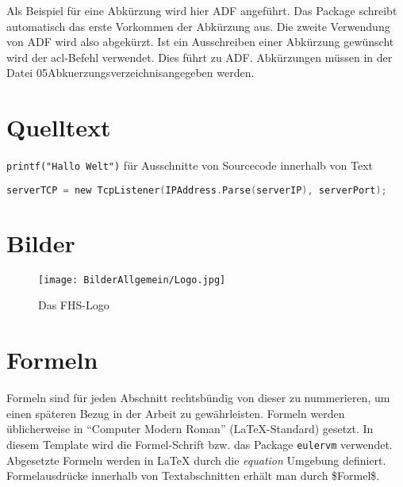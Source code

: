 Als Beispiel für eine Abkürzung wird hier \ac{ADF} angeführt. Das Package schreibt automatisch das erste Vorkommen der Abkürzung aus. Die zweite Verwendung von \ac{ADF} wird also abgekürzt. Ist ein Ausschreiben einer Abkürzung gewünscht wird der acl-Befehl verwendet. Dies führt zu \acl{ADF}. Abkürzungen müssen in der Datei \glqq 05Abkuerzungsverzeichnis\grqq angegeben werden.

\section{Quelltext}

\texttt{printf("Hallo Welt")} für Ausschnitte von Sourcecode innerhalb von Text

\begin{lstlisting}[language=C,
caption=Beispiel-Listing,
label=LST_SAMPLE]
serverTCP = new TcpListener(IPAddress.Parse(serverIP), serverPort);
\end{lstlisting}



\section{Bilder}

\begin{figure}[H]
\begin{center}
	\texttt{[image: BilderAllgemein/Logo.jpg]}
\end{center}
	\caption{Das FHS-Logo}
	\label{FIG_LOGO}
\end{figure}

\section{Formeln}

Formeln sind für jeden Abschnitt rechtsbündig von dieser zu nummerieren, um einen späteren Bezug in der Arbeit zu gewährleisten. Formeln werden üblicherweise in "`Computer Modern Roman"' (\LaTeX{}-Standard) gesetzt. In diesem Template wird die Formel-Schrift bzw. das Package \texttt{eulervm} verwendet. Abgesetzte Formeln werden in \LaTeX{} durch die 
\emph{equation} Umgebung definiert. Formelausdrücke innerhalb von Textabschnitten erhält man durch \$Formel\$.

